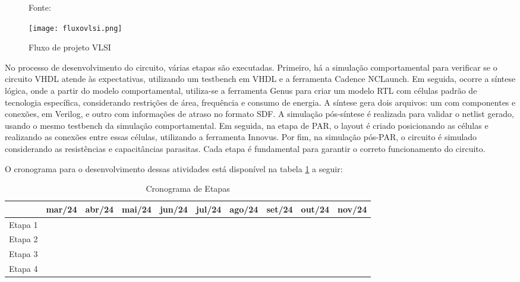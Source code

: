 \begin{figure}[ht!]
  \centering
  \captionsetup{justification=centering}
  \caption*{Fonte: \cite{CMOS2010}}
  \texttt{[image: fluxovlsi.png]}
  \caption{Fluxo de projeto VLSI}
  \label{fig:CMOS2010}
\end{figure}

No processo de desenvolvimento do circuito, várias etapas são executadas. Primeiro, há a simulação comportamental para verificar se o circuito VHDL atende às expectativas, utilizando um testbench em VHDL e a ferramenta Cadence NCLaunch. Em seguida, ocorre a síntese lógica, onde a partir do modelo comportamental, utiliza-se a ferramenta Genus para criar um modelo RTL com células padrão de tecnologia específica, considerando restrições de área, frequência e consumo de energia. A síntese gera dois arquivos: um com componentes e conexões, em Verilog, e outro com informações de atraso no formato SDF. A simulação pós-síntese é realizada para validar o netlist gerado, usando o mesmo testbench da simulação comportamental. Em seguida, na etapa de PAR, o layout é criado posicionando as células e realizando as conexões entre essas células, utilizando a ferramenta Innovus. Por fim, na simulação pós-PAR, o circuito é simulado considerando as resistências e capacitâncias parasitas. Cada etapa é fundamental para garantir o correto funcionamento do circuito.

O cronograma para o desenvolvimento dessas atividades está disponível na tabela \ref{tab:cronograma} a seguir:

\begin{table}[ht!]
  \centering
  \renewcommand{\arraystretch}{0.8} %
  \setlength{\tabcolsep}{4pt} %
  \begin{tabular}{|l|c|c|c|c|c|c|c|c|c|}
  \hline
  & mar/24 & abr/24 & mai/24 & jun/24 & jul/24 & ago/24 & set/24 & out/24 & nov/24\\
  \hline
  Etapa 1 & \cellcolor{yellow} & \cellcolor{yellow} &&&&&&& \\
  \rowcolor{gray!20} %
  Etapa 2 && \cellcolor{yellow} & \cellcolor{yellow} & \cellcolor{yellow} &&&&&\\
  Etapa 3 &&& \cellcolor{yellow} & \cellcolor{yellow} & \cellcolor{yellow} & \cellcolor{yellow} &&&\\ 
  \rowcolor{gray!20} %
  Etapa 4 &&&&&& \cellcolor{yellow}& \cellcolor{yellow} & \cellcolor{yellow} & \cellcolor{yellow}\\ 
  \hline
\end{tabular}
\caption{Cronograma de Etapas}
\label{tab:cronograma}
\end{table}
  